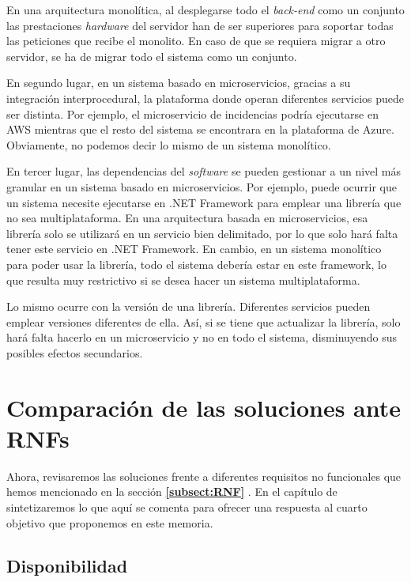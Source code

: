 \documentclass[11pt,spanish,listoffigures]{tfgetsinf}
\begin{document}
En una arquitectura monolítica, al desplegarse todo el \textit{back-end} como un conjunto las prestaciones \textit{hardware} del servidor han de ser superiores para soportar todas las peticiones que recibe el monolito. En caso de que se requiera migrar a otro servidor, se ha de migrar todo el sistema como un conjunto.

En segundo lugar, en un sistema basado en microservicios, gracias a su integración interprocedural, la plataforma donde operan diferentes servicios puede ser distinta. Por ejemplo, el microservicio de incidencias podría ejecutarse en AWS mientras que el resto del sistema se encontrara en la plataforma de Azure. Obviamente, no podemos decir lo mismo de un sistema monolítico.

En tercer lugar, las dependencias del \textit{software} se pueden gestionar a un nivel más granular en un sistema basado en microservicios. Por ejemplo, puede ocurrir que un sistema necesite ejecutarse en .NET Framework para emplear una librería que no sea multiplataforma. En una arquitectura basada en microservicios, esa librería solo se utilizará en un servicio bien delimitado, por lo que solo hará falta tener este servicio en .NET Framework. En cambio, en un sistema monolítico para poder usar la librería, todo el sistema debería estar en este framework, lo que resulta muy restrictivo si se desea hacer un sistema multiplataforma.

Lo mismo ocurre con la versión de una librería. Diferentes servicios pueden emplear versiones diferentes de ella. Así, si se tiene que actualizar la librería, solo hará falta hacerlo en un microservicio y no en todo el sistema, disminuyendo sus posibles efectos secundarios.

\section{Comparación de las soluciones ante RNFs}

Ahora, revisaremos las soluciones frente a diferentes requisitos no funcionales que hemos mencionado en la sección \textbf{\ref{subsect:RNF} }. En el capítulo de \textbf{} sintetizaremos lo que aquí se comenta para ofrecer una respuesta al cuarto objetivo que proponemos en este memoria.

\subsection{Disponibilidad}
\end{document}
